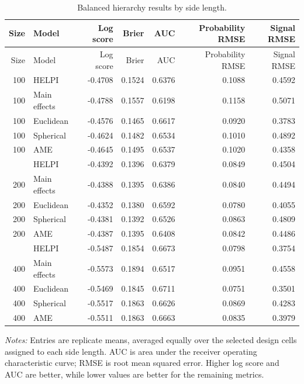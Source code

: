 \documentclass[
  12pt]{article}
\newcommand{\TableNote}[1]{%
  \par\vspace{0.35em}\noindent
  \begin{minipage}{0.96\linewidth}
    \footnotesize\setstretch{1.05}\raggedright
    \textit{Notes:} #1
  \end{minipage}%
  \par\vspace{0.6\baselineskip}%
}
\theoremstyle{definition}
\theoremstyle{plain}
\begin{document}
\begingroup
\small
\setlength{\tabcolsep}{4pt}
\begin{longtable}{@{}r@{\hspace{1.2em}}lrrrrr@{}}
	\caption{Balanced hierarchy results by side length.}\label{tab:balanced-size}\\
	\toprule
	Size & Model & Log score & Brier & AUC & Probability RMSE & Signal RMSE \\
	\midrule
	\endfirsthead
	\toprule
	Size & Model & Log score & Brier & AUC & Probability RMSE & Signal RMSE \\
	\midrule
	\endhead
	100 & HELPI & -0.4708 & 0.1524 & 0.6376 & 0.1088 & 0.4592 \\
	100 & Main effects & -0.4788 & 0.1557 & 0.6198 & 0.1158 & 0.5071 \\
	100 & Euclidean & -0.4576 & 0.1465 & 0.6617 & 0.0920 & 0.3783 \\
	100 & Spherical & -0.4624 & 0.1482 & 0.6534 & 0.1010 & 0.4892 \\
	100 & AME & -0.4645 & 0.1495 & 0.6537 & 0.1020 & 0.4358 \\
	\addlinespace
	200 & HELPI & -0.4392 & 0.1396 & 0.6379 & 0.0849 & 0.4504 \\
	200 & Main effects & -0.4388 & 0.1395 & 0.6386 & 0.0840 & 0.4494 \\
	200 & Euclidean & -0.4352 & 0.1380 & 0.6592 & 0.0780 & 0.4055 \\
	200 & Spherical & -0.4381 & 0.1392 & 0.6526 & 0.0863 & 0.4809 \\
	200 & AME & -0.4387 & 0.1395 & 0.6408 & 0.0842 & 0.4486 \\
	\addlinespace
	400 & HELPI & -0.5487 & 0.1854 & 0.6673 & 0.0798 & 0.3754 \\
	400 & Main effects & -0.5573 & 0.1894 & 0.6517 & 0.0951 & 0.4558 \\
	400 & Euclidean & -0.5469 & 0.1845 & 0.6711 & 0.0751 & 0.3501 \\
	400 & Spherical & -0.5517 & 0.1863 & 0.6626 & 0.0869 & 0.4283 \\
	400 & AME & -0.5511 & 0.1863 & 0.6663 & 0.0835 & 0.3979 \\
	\bottomrule
\end{longtable}
\TableNote{Entries are replicate means, averaged equally over the selected design cells assigned to each side length. AUC is area under the receiver operating characteristic curve; RMSE is root mean squared error. Higher log score and AUC are better, while lower values are better for the remaining metrics.}
\endgroup
\end{document}
